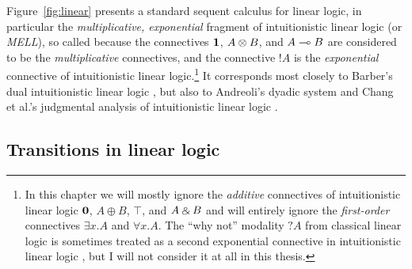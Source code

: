 

Figure~\ref{fig:linear} presents a standard sequent calculus for
linear logic, in particular the {\it multiplicative, exponential}
fragment of intuitionistic linear logic (or {\it MELL}), so called
because the connectives $\mathbf{1}$, $A \otimes B$, and $A \multimap B$ are
considered to be the {\it multiplicative} connectives, and the
connective ${!}A$ is the {\it exponential} connective of intuitionistic
linear logic.\footnote{In this chapter we will mostly ignore the {\it
    additive} connectives of intuitionistic linear logic $\mathbf{0}$, $A
  \oplus B$, $\top$, and $A \mathbin{\binampersand} B$ and will entirely ignore the {\it
    first-order} connectives $\exists x.A$ and $\forall x.A$. The
  ``why not'' modality $\mbox{?}A$ from classical linear logic is
  sometimes treated as a second exponential connective in
  intuitionistic linear logic \cite{chang03judgmental}, but I will not
  consider it at all in this thesis.} It corresponds most closely to
Barber's dual intuitionistic linear logic \cite{barber96dual}, but
also to Andreoli's dyadic system \cite{andreoli92logic} and Chang et
al.'s judgmental analysis of intuitionistic linear logic
\cite{chang03judgmental}.

\subsection{Transitions in linear logic}

